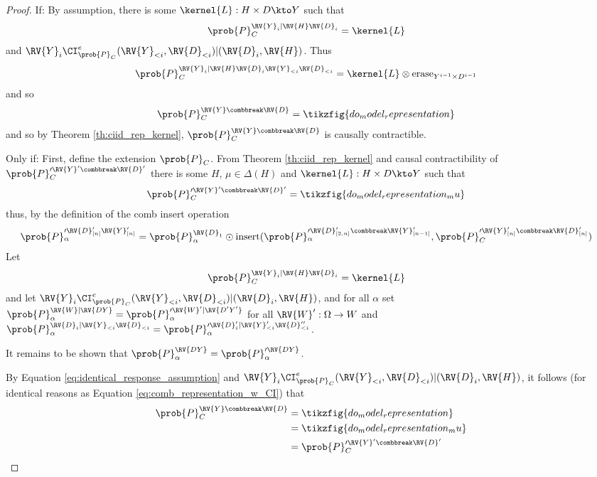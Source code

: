 \begin{proof}
If:
By assumption, there is some $\kernel{L}:H\times D\kto Y$ such that
\begin{align}
    \prob{P}_C^{\RV{Y}_i|\RV{H}\RV{D}_i} &= \kernel{L}
\end{align}
and $\RV{Y}_i\CI^e_{\prob{P}_C} (\RV{Y}_{<i},\RV{D}_{<i})|(\RV{D}_i,\RV{H})$. Thus
\begin{align}
    \prob{P}_C^{\RV{Y}_i|\RV{H}\RV{D}_i\RV{Y}_{<i}\RV{D}_{<i}} &= \kernel{L}\otimes \text{erase}_{Y^{i-1}\times D^{i-1}}
\end{align}
and so
\begin{align}
    \prob{P}_C^{\RV{Y}\combbreak \RV{D}} &= \tikzfig{do_model_representation}\label{eq:comb_representation_w_CI}
\end{align}
and so by Theorem \ref{th:ciid_rep_kernel}, $\prob{P}_C^{\RV{Y}\combbreak \RV{D}}$ is causally contractible.

Only if:
First, define the extension $\prob{P}_C$. From Theorem \ref{th:ciid_rep_kernel} and causal contractibility of $\prob{P}_C^{\prime \RV{Y}'\combbreak \RV{D}'}$ there is some $H$, $\mu\in \Delta(H)$ and $\kernel{L}:H\times D\kto Y$ such that
\begin{align}
    \prob{P}_C^{\prime \RV{Y}'\combbreak\RV{D}'} &= \tikzfig{do_model_representation_mu}
\end{align}
thus, by the definition of the comb insert operation
\begin{align}
    \prob{P}_\alpha^{\prime\RV{D}'_{[n]} \RV{Y}'_{[n]}} &= \prob{P}_\alpha^{\RV{D}_1}\odot \text{insert}(\prob{P}_\alpha^{\prime \RV{D}'_{[2,n]}\combbreak\RV{Y}'_{[n-1]}}, \prob{P}_C^{\prime \RV{Y}'_{[n]}\combbreak\RV{D}'_{[n]}}) 
\end{align}
Let
\begin{align}
    \prob{P}_C^{\RV{Y}_i|\RV{H}\RV{D}_i} &= \kernel{L}\label{eq:identical_response_assumption}
\end{align}
and let $\RV{Y}_i\CI^e_{\prob{P}_C} (\RV{Y}_{<i},\RV{D}_{<i})|(\RV{D}_i,\RV{H})$, and for all $\alpha$ set $\prob{P}_\alpha^{\RV{W}|\RV{DY}}=\prob{P}_\alpha^{\prime \RV{W}'|\RV{D'Y'}}$ for all $\RV{W}':\Omega\to W$ and $\prob{P}_\alpha^{\RV{D}_i|\RV{Y}_{<i}\RV{D}_{<i}}=\prob{P}_\alpha^{\prime \RV{D}_i'|\RV{Y}_{<i}'\RV{D}_{<i}''}$.

It remains to be shown that $\prob{P}_\alpha^{\RV{DY}}=\prob{P}_\alpha^{\prime \RV{DY}}$.

By Equation \ref{eq:identical_response_assumption} and $\RV{Y}_i\CI^e_{\prob{P}_C} (\RV{Y}_{<i},\RV{D}_{<i})|(\RV{D}_i,\RV{H})$, it follows (for identical reasons as Equation \ref{eq:comb_representation_w_CI}) that
\begin{align}
    \prob{P}_C^{\RV{Y}\combbreak \RV{D}} &= \tikzfig{do_model_representation}\\
    &= \tikzfig{do_model_representation_mu}\\
    &= \prob{P}_C^{\prime \RV{Y}'\combbreak\RV{D}'}
\end{align}


\end{proof}

